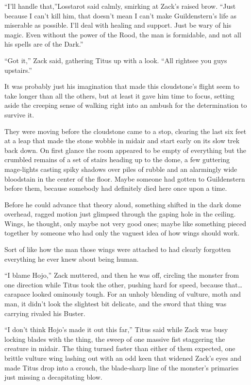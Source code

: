 ``I'll handle that,''Losstarot said calmly, smirking at Zack's raised brow. ``Just because I can't kill him, that doesn't mean I can't make Guildenstern's life as miserable as possible. I'll deal with healing and support. Just be wary of his magic. Even without the power of the Rood, the man is formidable, and not all his spells are of the Dark.''

``Got it,'' Zack said, gathering Titus up with a look. ``All right\textemdash see you guys upstairs.''

It was probably just his imagination that made this cloudstone's flight seem to take longer than all the others, but at least it gave him time to focus, setting aside the creeping sense of walking right into an ambush for the determination to survive it.

They were moving before the cloudstone came to a stop, clearing the last six feet at a leap that made the stone wobble in midair and start early on its slow trek back down. On first glance the room appeared to be empty of everything but the crumbled remains of a set of stairs heading up to the dome, a few guttering mage-lights casting spiky shadows over piles of rubble and an alarmingly wide bloodstain in the center of the floor. Maybe someone had gotten to Guildenstern before them, because somebody had definitely died here once upon a time.
\begin{sloppypar}
Before he could advance that theory aloud, something shifted in the dark dome overhead, ragged motion just glimpsed through the gaping hole in the ceiling. Wings, he thought, only maybe not very good ones; maybe like something pieced together by someone who had only the vaguest idea of how wings should work.
\end{sloppypar}
Sort of like how the man those wings were attached to had clearly forgotten everything he ever knew about being human.

``I blame Hojo,'' Zack muttered, and then he was off, circling the monster from one direction while Titus took the other, pushing hard for speed, because that\ldots carapace looked ominously tough. For an unholy blending of vulture, moth and man, it didn't look the slightest bit delicate, and the sword that thing was carrying rivaled his Buster.

``I don't think Hojo's made it out this far,'' Titus said while Zack was busy locking blades with the thing, the sweep of one massive fist staggering the creature in midair. The thing turned faster than either of them expected, one brittle vulture wing lashing out with an odd keen that widened Zack's eyes and made Titus drop into a crouch, the blade-sharp line of the monster's primaries just missing a decapitating blow.

